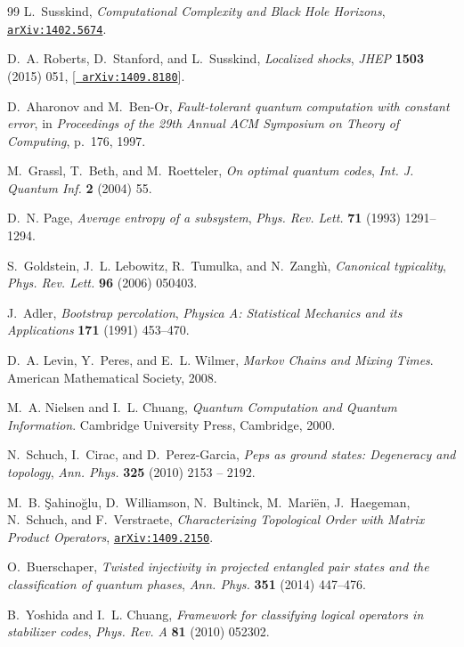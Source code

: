 \documentclass[12pt]{article}
\theoremstyle{plain}
\theoremstyle{plain}
\theoremstyle{plain}
\theoremstyle{plain}
\theoremstyle{result}
\theoremstyle{remark}
\theoremstyle{conjecture}
\theoremstyle{observation}
\theoremstyle{definition}
\theoremstyle{corollary}
\theoremstyle{definition}
\theoremstyle{definition}
\theoremstyle{assumption}
\theoremstyle{definition}
\theoremstyle{problem}
\theoremstyle{fact}
\begin{document}
\begin{thebibliography}{99}
L.~Susskind, {\it {Computational Complexity and Black Hole Horizons}},
  \href{http://arxiv.org/abs/1402.5674}{{\tt arXiv:1402.5674}}.

D.~A. Roberts, D.~Stanford, and L.~Susskind, {\it {Localized shocks}},  {\em
  JHEP} {\bf 1503} (2015) 051, [\href{http://arxiv.org/abs/1409.8180}{{\tt
  arXiv:1409.8180}}].

D.~Aharonov and M.~Ben-Or, {\it Fault-tolerant quantum computation with
  constant error},  in {\em Proceedings of the 29th Annual ACM Symposium on
  Theory of Computing}, p.~176, 1997.

M.~Grassl, T.~Beth, and M.~Roetteler, {\it On optimal quantum codes},  {\em
  Int. J. Quantum Inf.} {\bf 2} (2004) 55.

D.~N. Page, {\it Average entropy of a subsystem},  {\em Phys. Rev. Lett.} {\bf
  71} (1993) 1291--1294.

S.~Goldstein, J.~L. Lebowitz, R.~Tumulka, and N.~Zangh{\`\i}, {\it Canonical
  typicality},  {\em Phys. Rev. Lett.} {\bf 96} (2006) 050403.

J.~Adler, {\it {Bootstrap percolation}},  {\em Physica A: Statistical Mechanics
  and its Applications} {\bf 171} (1991) 453--470.

D.~A. Levin, Y.~Peres, and E.~L. Wilmer, {\em Markov Chains and Mixing Times}.
\newblock American Mathematical Society, 2008.

M.~A. {Nielsen} and I.~L. {Chuang}, {\em Quantum Computation and Quantum
  Information}.
\newblock Cambridge University Press, Cambridge, 2000.

N.~Schuch, I.~Cirac, and D.~Perez-Garcia, {\it Peps as ground states:
  Degeneracy and topology},  {\em Ann. Phys.} {\bf 325} (2010) 2153 -- 2192.

M.~B. {\c{S}}ahino{\u{g}}lu, D.~Williamson, N.~Bultinck, M.~Mari\"{e}n,
  J.~Haegeman, N.~Schuch, and F.~Verstraete, {\it {Characterizing Topological
  Order with Matrix Product Operators}},
  \href{http://arxiv.org/abs/1409.2150}{{\tt arXiv:1409.2150}}.

O.~Buerschaper, {\it {Twisted injectivity in projected entangled pair states
  and the classification of quantum phases}},  {\em Ann. Phys.} {\bf 351}
  (2014) 447--476.

B.~Yoshida and I.~L. Chuang, {\it Framework for classifying logical operators
  in stabilizer codes},  {\em Phys. Rev. A} {\bf 81} (2010) 052302.


\end{thebibliography}
\end{document}
